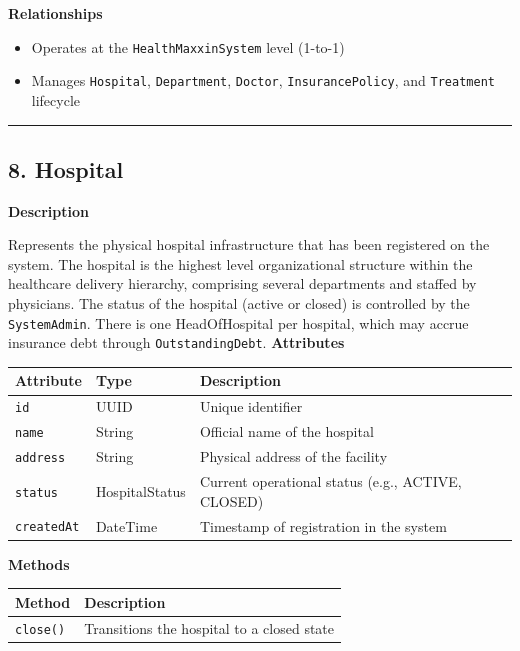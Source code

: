 \documentclass[12pt, a4paper]{article}
\begin{document}
\textbf{Relationships}

\begin{itemize}
    \item Operates at the \texttt{HealthMaxxinSystem} level (1-to-1)
    \item Manages \texttt{Hospital}, \texttt{Department}, \texttt{Doctor}, \texttt{InsurancePolicy}, and \texttt{Treatment} lifecycle
\end{itemize}

\par\medskip\hrule\medskip

\subsection{8. Hospital}\label{sec:8-hospital}

\textbf{Description}

Represents the physical hospital infrastructure that has been registered on the system. The hospital is the highest level organizational structure within the healthcare delivery hierarchy, comprising several departments and staffed by physicians. The status of the hospital (active or closed) is controlled by the \texttt{SystemAdmin}. There is one HeadOfHospital per hospital, which may accrue insurance debt through \texttt{OutstandingDebt}.
\textbf{Attributes}

\begin{center}
\small
\renewcommand{\arraystretch}{1.35}
\begin{tabularx}{\textwidth}{|>{\raggedright\arraybackslash}p{3.4cm}|>{\raggedright\arraybackslash}p{3.3cm}|Y|}
\hline
{}
\textbf{Attribute} & \textbf{Type} & \textbf{Description} \\ \hline
\texttt{id} & UUID & Unique identifier \\ \hline
\texttt{name} & String & Official name of the hospital \\ \hline
\texttt{address} & String & Physical address of the facility \\ \hline
\texttt{status} & HospitalStatus & Current operational status (e.g., ACTIVE, CLOSED) \\ \hline
\texttt{createdAt} & DateTime & Timestamp of registration in the system \\ \hline
\end{tabularx}
\end{center}

\textbf{Methods}

\begin{center}
\small
\renewcommand{\arraystretch}{1.35}
\begin{tabularx}{\textwidth}{|M|Y|}
\hline
{}
\textbf{Method} & \textbf{Description} \\ \hline
\texttt{close()} & Transitions the hospital to a closed state \\ \hline
\end{tabularx}
\end{center}
\end{document}
